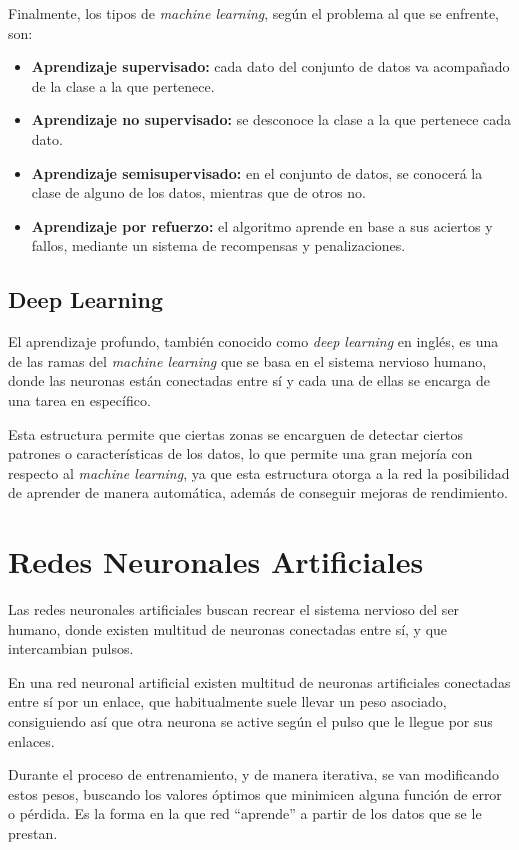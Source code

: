 Finalmente, los tipos de \emph{machine learning}, según el problema al que se enfrente, son:
\begin{itemize}
    \item \textbf{Aprendizaje supervisado:} cada dato del conjunto de datos va acompañado de la clase a la que pertenece.
    \item \textbf{Aprendizaje no supervisado:} se desconoce la clase a la que pertenece cada dato.
    \item \textbf{Aprendizaje semisupervisado:} en el conjunto de datos, se conocerá la clase de alguno de los datos, mientras que de otros no.
    \item \textbf{Aprendizaje por refuerzo:} el algoritmo aprende en base a sus aciertos y fallos, mediante un sistema de recompensas y penalizaciones.
\end{itemize}

\subsection{Deep Learning}
El aprendizaje profundo, también conocido como \emph{deep learning} en inglés, \cite{bobadilla2021machine} es una de las ramas del \emph{machine learning} que se basa en el sistema nervioso humano, donde las neuronas están conectadas entre sí y cada una de ellas se encarga de una tarea en específico.

Esta estructura permite que ciertas zonas se encarguen de detectar ciertos patrones o características de los datos, lo que permite una gran mejoría con respecto al \emph{machine learning}, ya que esta estructura otorga a la red la posibilidad de aprender de manera automática, además de conseguir mejoras de rendimiento.

\section{Redes Neuronales Artificiales}
Las redes neuronales artificiales \cite{izaurieta2000redes} buscan recrear el sistema nervioso del ser humano, donde existen multitud de neuronas conectadas entre sí, y que intercambian pulsos.

En una red neuronal artificial existen multitud de neuronas artificiales conectadas entre sí por un enlace, que habitualmente suele llevar un peso asociado, consiguiendo así que otra neurona se active según el pulso que le llegue por sus enlaces.

Durante el proceso de entrenamiento, y de manera iterativa, se van modificando estos pesos, buscando los valores óptimos que minimicen alguna función de error o pérdida. Es la forma en la que red ``aprende'' a partir de los datos que se le prestan.

